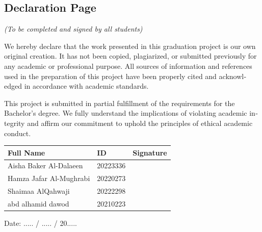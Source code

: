 \begin{english}

\thispagestyle{empty}

\section*{\centering Declaration Page}
\begin{center}
{\itshape (To be completed and signed by all students)}
\end{center}

We hereby declare that the work presented in this graduation project is our own original
creation. It has not been copied, plagiarized, or submitted previously for any academic or
professional purpose. All sources of information and references used in the preparation of this
project have been properly cited and acknowledged in accordance with academic standards.

\vspace{0.5cm}

This project is submitted in partial fulfillment of the requirements for the Bachelor's degree.
We fully understand the implications of violating academic integrity and affirm our commitment
to uphold the principles of ethical academic conduct.

\vspace{1cm}

\begin{center}
\begin{tabular}{|p{6cm}|p{3cm}|p{4cm}|}
\hline
\textbf{Full Name} & \textbf{ID} & \textbf{Signature} \\
\hline
Aisha Baker Al-Dalaeen & 20223336 & \\[0.8cm] \hline
 Hamza Jafar Al-Mughrabi& 20220273 & \\[0.8cm] \hline
Shaimaa AlQahwaji & 20222298 & \\[0.8cm] \hline
 abd alhamid dawod & 20210223& \\[0.8cm] \hline

\end{tabular}
\end{center}

\vspace{1cm}

Date: ..... / ..... / 20.....
\end{english}